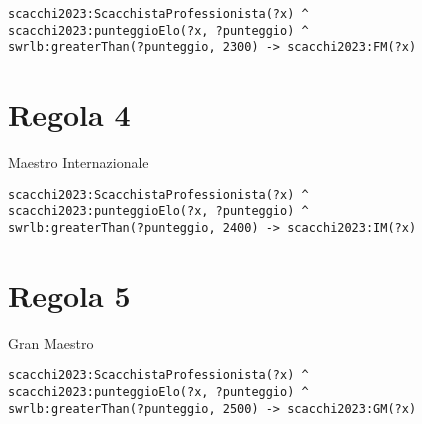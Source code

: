 \documentclass[12pt]{book}
\begin{document}
\begin{verbatim}
scacchi2023:ScacchistaProfessionista(?x) ^
scacchi2023:punteggioElo(?x, ?punteggio) ^
swrlb:greaterThan(?punteggio, 2300) -> scacchi2023:FM(?x)
\end{verbatim}

\section{Regola 4}

Maestro Internazionale

\begin{verbatim}
scacchi2023:ScacchistaProfessionista(?x) ^
scacchi2023:punteggioElo(?x, ?punteggio) ^
swrlb:greaterThan(?punteggio, 2400) -> scacchi2023:IM(?x)
\end{verbatim}

\section{Regola 5}

Gran Maestro

\begin{verbatim}
scacchi2023:ScacchistaProfessionista(?x) ^
scacchi2023:punteggioElo(?x, ?punteggio) ^
swrlb:greaterThan(?punteggio, 2500) -> scacchi2023:GM(?x)
\end{verbatim}
\end{document}
